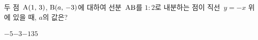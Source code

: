 두 점~$\mathrm{A}(1,\,3)$, $\mathrm{B}(a,\,-3)$에 대하여 선분~$\mathrm{AB}$를 $1:2$로 내분하는 점이 직선~$y=-x$ 위에 있을 때, $a$의 값은?
\begin{choices32}{$-5$}{$-3$}{$-1$}{$3$}{$5$}\end{choices32}
